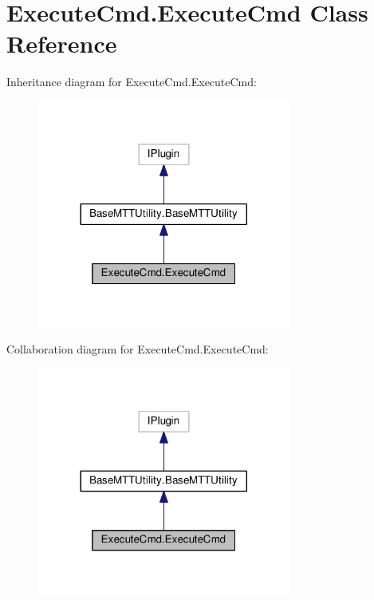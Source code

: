 \hypertarget{class_execute_cmd_1_1_execute_cmd}{\section{Execute\-Cmd.\-Execute\-Cmd Class Reference}
\label{class_execute_cmd_1_1_execute_cmd}
}


Inheritance diagram for Execute\-Cmd.\-Execute\-Cmd\-:
\nopagebreak
\begin{figure}[H]
\begin{center}
\leavevmode
\includegraphics[width=236pt]{class_execute_cmd_1_1_execute_cmd__inherit__graph}
\end{center}
\end{figure}


Collaboration diagram for Execute\-Cmd.\-Execute\-Cmd\-:
\nopagebreak
\begin{figure}[H]
\begin{center}
\leavevmode
\includegraphics[width=236pt]{class_execute_cmd_1_1_execute_cmd__coll__graph}
\end{center}
\end{figure}
